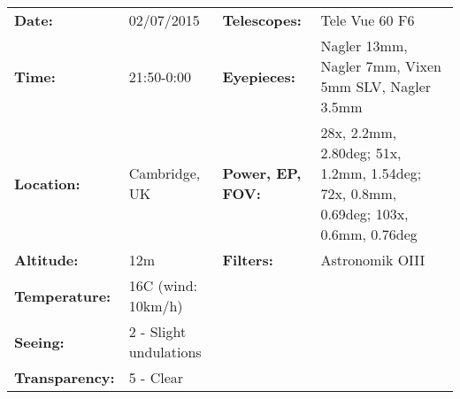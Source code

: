 \begin{tabular}{ p{0.9in} p{1.3in} p{1.2in} p{5.2in}}
{\bf Date:} & 02/07/2015 & {\bf Telescopes:} & Tele Vue 60 F6 \\ 
{\bf Time:} & 21:50-0:00 & {\bf Eyepieces:} & Nagler 13mm, Nagler 7mm, Vixen 5mm SLV, Nagler 3.5mm \\ 
{\bf Location:} & Cambridge, UK & {\bf Power, EP, FOV:} & 28x, 2.2mm, 2.80deg; 51x, 1.2mm, 1.54deg; 72x, 0.8mm, 0.69deg; 103x, 0.6mm, 0.76deg \\ 
{\bf Altitude:} & 12m & {\bf Filters:} & Astronomik OIII \\ 
{\bf Temperature:} & 16C (wind: 10km/h) & & \\ 
{\bf Seeing:} & 2 - Slight undulations & & \\ 
{\bf Transparency:} & 5 - Clear & & \\ 
\end{tabular}
